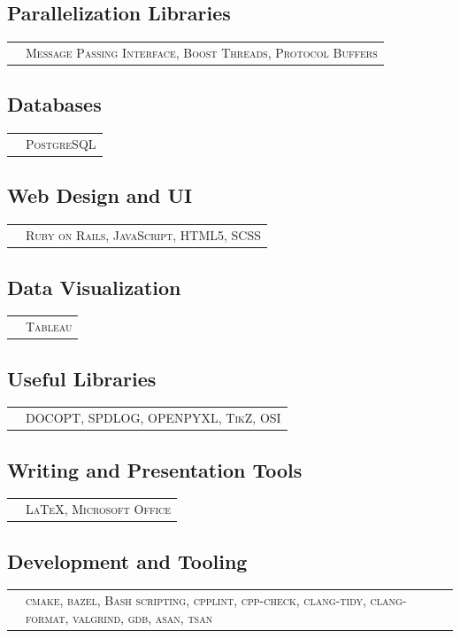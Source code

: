 \documentclass[10PT,letter]{article}
\newcommand{\subsectionstyle}[1]{\normalfont\selectfont\textcolor{titlecol}{\sffamily #1}}
\begin{document}
		 \subsection*{\subsectionstyle{Parallelization Libraries }}
				\begin{tabular}{p{.2in}p{5.55in}}
				 	& 	\textsc{Message Passing Interface, Boost Threads, Protocol Buffers}
				\end{tabular}
			
		\subsection*{\subsectionstyle{Databases }}
			\begin{tabular}{p{.2in}p{5.55in}}
			& 	\textsc{PostgreSQL}
		\end{tabular}			


		\subsection*{\subsectionstyle{Web Design and UI}}
			\begin{tabular}{p{.2in}p{5.55in}}
				& \textsc{Ruby on Rails, JavaScript, HTML5, SCSS} 
			\end{tabular}

     	\subsection*{\subsectionstyle{Data Visualization}}
				\begin{tabular}{p{.2in}p{5.55in}}
					& \textsc{Tableau} 
				\end{tabular}
     	\subsection*{\subsectionstyle{Useful Libraries}}
				\begin{tabular}{p{.2in}p{5.55in}}
					& \textsc{DOCOPT,  SPDLOG, OPENPYXL, TikZ, OSI} 
				\end{tabular}

		\subsection*{\subsectionstyle{Writing and Presentation Tools}}
				\begin{tabular}{p{.2in}p{5.55in}}
					 & \textsc{\LaTeX, Microsoft Office}
				\end{tabular}

        \subsection*{\subsectionstyle{Development and Tooling}}
        		\begin{tabular}{p{.2in}p{5.55in}}
        			& 	\textsc{cmake, bazel, Bash scripting,  cpplint, cpp-check, clang-tidy, clang-format, valgrind, gdb, asan, tsan} 
        		\end{tabular}
\end{document}
